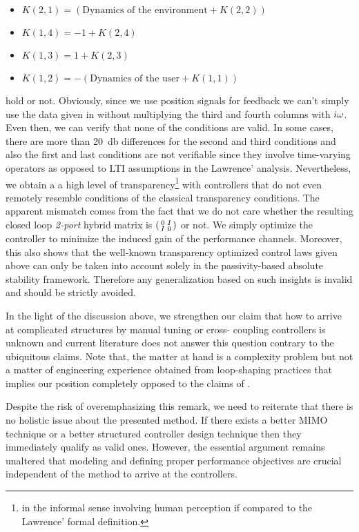 \begin{itemize}
    \item  $K(2,1)= (\text{Dynamics of the environment}+K(2,2))$
	\item  $K(1,4)= -1+K(2,4)$
    \item  $K(1,3)= 1+K(2,3)$
    \item  $K(1,2)= -(\text{Dynamics of the user}+K(1,1))$
\end{itemize}
hold or not. Obviously, since we use position signals for feedback we can't simply use the data given in  without 
multiplying the third and fourth columns with $i\omega$. Even then, we can verify that none of the conditions are valid. In some cases, there 
are more than \SI{20}{\decibel} differences for the second and third conditions and also the first and last conditions are not verifiable 
since they involve time-varying operators as opposed to LTI assumptions in the Lawrence' analysis. Nevertheless, we obtain a a high level 
of transparency\footnote{in the informal sense involving human perception if compared to the Lawrence' formal definition.} with 
controllers that do not even remotely resemble conditions of the classical transparency conditions. The apparent mismatch comes from the 
fact that we do not care whether the resulting closed loop \emph{2-port} hybrid matrix is $\begin{psmallmatrix}0&I\\I&0\end{psmallmatrix}$
 or not. We simply optimize the controller to minimize the induced gain of the performance channels. Moreover, this also shows that the 
well-known transparency optimized control laws given above can only be taken into account solely in the passivity-based absolute 
stability framework. Therefore any generalization based on such insights is invalid and should be strictly avoided.


In the light of the discussion above, we strengthen our claim that how to arrive at complicated structures by manual tuning or cross-
coupling controllers is unknown and current literature does not answer this question contrary to the ubiquitous claims. Note that, the 
matter at hand is a complexity problem but not a matter of engineering experience obtained from loop-shaping practices that implies our 
position completely opposed to the claims of \cite{danielmcaree}. 

Despite the risk of overemphasizing this remark, we need to reiterate that there is no holistic issue about the presented method. If 
there exists a better MIMO technique or a better structured controller design technique then they immediately qualify as valid ones. 
However, the essential argument remains unaltered that modeling and defining proper performance objectives are crucial independent of the 
method to arrive at the controllers.


